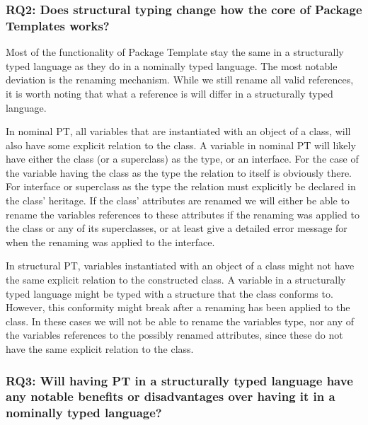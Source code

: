 

\subsubsection{RQ2: Does structural typing change how the core of Package Templates works?}

Most of the functionality of Package Template stay the same in a structurally typed language as they do in a nominally typed language.
The most notable deviation is the renaming mechanism.
While we still rename all valid references, it is worth noting that what a reference is will differ in a structurally typed language.

In nominal PT, all variables that are instantiated with an object of a class, will also have some explicit relation to the class.
A variable in nominal PT will likely have either the class (or a superclass) as the type, or an interface.
For the case of the variable having the class as the type the relation to itself is obviously there.
For interface or superclass as the type the relation must explicitly be declared in the class' heritage.
If the class' attributes are renamed we will either be able to rename the variables references to these attributes if the renaming was applied to the class or any of its superclasses, or at least give a detailed error message for when the renaming was applied to the interface.

In structural PT, variables instantiated with an object of a class might not have the same explicit relation to the constructed class.
A variable in a structurally typed language might be typed with a structure that the class conforms to.
However, this conformity might break after a renaming has been applied to the class.
In these cases we will not be able to rename the variables type, nor any of the variables references to the possibly renamed attributes, since these do not have the same explicit relation to the class.

\subsubsection{RQ3: Will having PT in a structurally typed language have any notable benefits or disadvantages over having it in a nominally typed language?}

